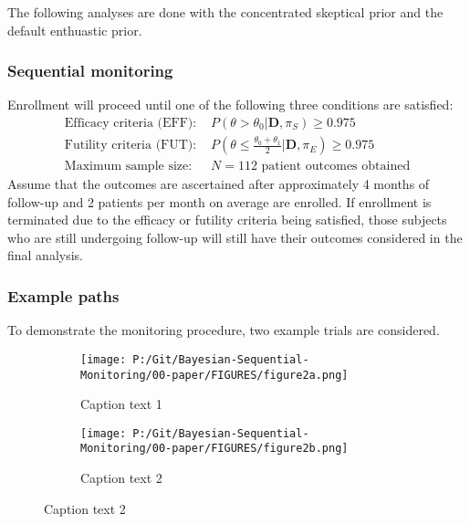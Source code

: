 \documentclass[12pt]{article}
\begin{document}
The following analyses are done with the concentrated skeptical prior and the default enthuastic prior.
\subsubsection{Sequential monitoring}
Enrollment will proceed until one of the following three conditions are satisfied:
\begin{align*}
\text{Efficacy criteria (EFF): }&P(\theta>\theta_0|\mathbf{D},\pi_S)\geq 0.975\\
\text{Futility criteria (FUT): }&P\left(\theta\leq\frac{\theta_0+\theta_1}{2} \Big|\mathbf{D},\pi_E\right)\geq 0.975\\
\text{Maximum sample size: }&N=112 \text{ patient outcomes obtained}
\end{align*}
Assume that the outcomes are ascertained after approximately 4 months of follow-up and 2 patients per month on average are enrolled. If enrollment is terminated due to the efficacy or futility criteria being satisfied, those subjects who are still undergoing follow-up will still have their outcomes considered in the final analysis.
\subsubsection{Example paths}
To demonstrate the monitoring procedure, two example trials are considered. 

\begin{figure}
  \begin{subfigure}{6cm}
    \centering\texttt{[image: P:/Git/Bayesian-Sequential-Monitoring/00-paper/FIGURES/figure2a.png]}
    \caption{Caption text 1}
  \end{subfigure}
  \begin{subfigure}{6cm}
    \centering\texttt{[image: P:/Git/Bayesian-Sequential-Monitoring/00-paper/FIGURES/figure2b.png]}
    \caption{Caption text 2}
  \end{subfigure}
 
\end{figure}
\end{document}
